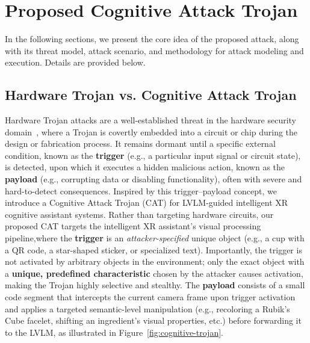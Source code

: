 \documentclass[sigconf,review,anonymous]{acmart}
\begin{document}
\section{Proposed Cognitive Attack Trojan}
In the following sections, we present the core idea of the proposed attack, along with its threat model, attack scenario, and methodology for attack modeling and execution. Details are provided below.


\subsection{Hardware Trojan vs. Cognitive Attack Trojan}
\label{sec:trojan}
Hardware Trojan attacks are a well-established threat in the hardware security domain~\cite{gubbi2023hardware,bhunia2014hardware,king2008designing}, where a Trojan is covertly embedded into a circuit or chip during the design or fabrication process. It remains dormant until a specific external condition, known as the \textbf{trigger} (e.g., a particular input signal or circuit state), is detected, upon which it executes a hidden malicious action, known as the \textbf{payload} (e.g., corrupting data or disabling functionality), often with severe and hard-to-detect consequences. Inspired by this trigger--payload concept, we introduce a Cognitive Attack Trojan (CAT) for LVLM-guided intelligent XR cognitive assistant systems. Rather than targeting hardware circuits, our proposed CAT targets the intelligent XR assistant's visual processing pipeline,where the \textbf{trigger} is an \emph{attacker-specified} unique object (e.g., a cup with a QR code, a star-shaped sticker, or specialized text). Importantly, the trigger is not activated by arbitrary objects in the environment; only the exact object with a \textbf{unique, predefined characteristic} chosen by the attacker causes activation, making the Trojan highly selective and stealthy.  The \textbf{payload} consists of a small code segment that intercepts the current camera frame upon trigger activation and applies a targeted semantic-level manipulation (e.g., recoloring a Rubik's Cube facelet, shifting an ingredient's visual properties, etc.) before forwarding it to the LVLM, as illustrated in Figure~\ref{fig:cognitive-trojan}.
\end{document}
